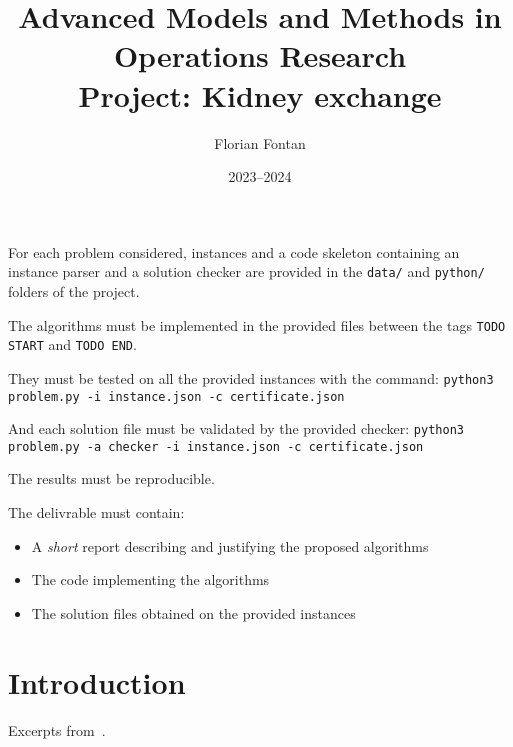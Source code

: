 \documentclass[a4paper,twocolumn]{article}
\author{Florian Fontan}
\title{Advanced Models and Methods in Operations Research \\ Project: Kidney exchange}
\date{2023--2024}
\begin{document}
\maketitle

For each problem considered, instances and a code skeleton containing an instance parser and a solution checker are provided in the \texttt{data/} and \texttt{python/} folders of the project.

The algorithms must be implemented in the provided files between the tags \texttt{TODO START} and \texttt{TODO END}.

They must be tested on all the provided instances with the command:
\texttt{python3 problem.py -i instance.json -c certificate.json}

And each solution file must be validated by the provided checker:
\texttt{python3 problem.py -a checker -i instance.json -c certificate.json}

The results must be reproducible.

\bigskip

The delivrable must contain:
\begin{itemize}
  \item A \emph{short} report describing and justifying the proposed algorithms
  \item The code implementing the algorithms
  \item The solution files obtained on the provided instances
\end{itemize}

\section*{Introduction}

Excerpts from~\cite{pansart_algorithms_2020}.
\end{document}
